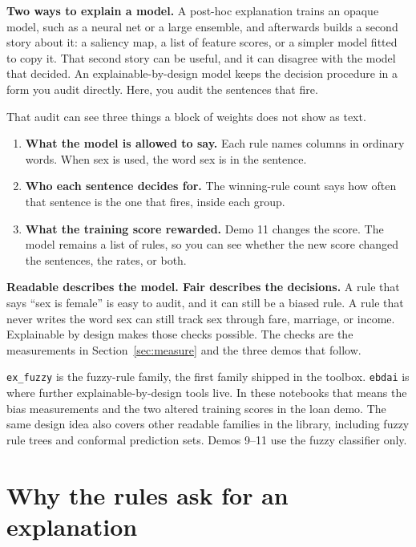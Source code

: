 \documentclass[11pt]{article}
\newcommand{\fn}[1]{\texttt{\small #1}}
\begin{document}
\begin{idea}
\textbf{Two ways to explain a model.} A post-hoc explanation trains an opaque model, such as a neural net or a large ensemble, and afterwards builds a second story about it: a saliency map, a list of feature scores, or a simpler model fitted to copy it. That second story can be useful, and it can disagree with the model that decided. An explainable-by-design model keeps the decision procedure in a form you audit directly. Here, you audit the sentences that fire.
\end{idea}

That audit can see three things a block of weights does not show as text.

\begin{enumerate}
  \item \textbf{What the model is allowed to say.} Each rule names columns in ordinary words. When sex is used, the word sex is in the sentence.
  \item \textbf{Who each sentence decides for.} The winning-rule count says how often that sentence is the one that fires, inside each group.
  \item \textbf{What the training score rewarded.} Demo 11 changes the score. The model remains a list of rules, so you can see whether the new score changed the sentences, the rates, or both.
\end{enumerate}

\begin{careful}
\textbf{Readable describes the model. Fair describes the decisions.} A rule that says ``sex is female'' is easy to audit, and it can still be a biased rule. A rule that never writes the word sex can still track sex through fare, marriage, or income. Explainable by design makes those checks possible. The checks are the measurements in Section~\ref{sec:measure} and the three demos that follow.
\end{careful}

\fn{ex\_fuzzy} is the fuzzy-rule family, the first family shipped in the toolbox. \fn{ebdai} is where further explainable-by-design tools live. In these notebooks that means the bias measurements and the two altered training scores in the loan demo. The same design idea also covers other readable families in the library, including fuzzy rule trees and conformal prediction sets. Demos 9--11 use the fuzzy classifier only.

\section{Why the rules ask for an explanation}
\label{sec:law}
\end{document}
